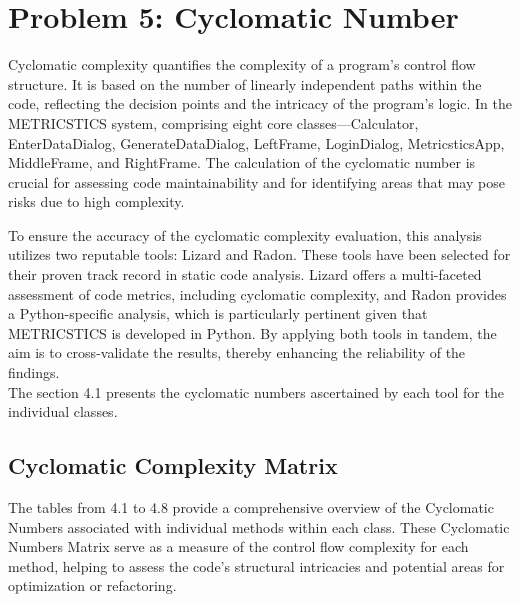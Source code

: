 \documentclass[english,12pt,a4paper]{report}
\begin{document}
	\chapter{Problem 5: Cyclomatic Number}
	Cyclomatic complexity quantifies the complexity of a program's control flow structure. It is based on the number of linearly independent paths within the code, reflecting the decision points and the intricacy of the program's logic. In the METRICSTICS system, comprising eight core classes—Calculator, EnterDataDialog, GenerateDataDialog, LeftFrame, LoginDialog, MetricsticsApp, MiddleFrame, and RightFrame. The calculation of the cyclomatic number is crucial for assessing code maintainability and for identifying areas that may pose risks due to high complexity.
	
	To ensure the accuracy of the cyclomatic complexity evaluation, this analysis utilizes two reputable tools: Lizard and Radon. These tools have been selected for their proven track record in static code analysis. Lizard offers a multi-faceted assessment of code metrics, including cyclomatic complexity, and Radon provides a Python-specific analysis, which is particularly pertinent given that METRICSTICS is developed in Python. By applying both tools in tandem, the aim is to cross-validate the results, thereby enhancing the reliability of the findings.\\
	\vspace{8pt}
	The section 4.1 presents the cyclomatic numbers ascertained by each tool for the individual classes.
	\section{Cyclomatic Complexity Matrix}
	The tables from 4.1 to 4.8 provide a comprehensive overview of the Cyclomatic Numbers associated with individual methods within each class. These Cyclomatic Numbers Matrix serve as a measure of the control flow complexity for each method, helping to assess the code's structural intricacies and potential areas for optimization or refactoring.
	
\end{document}
